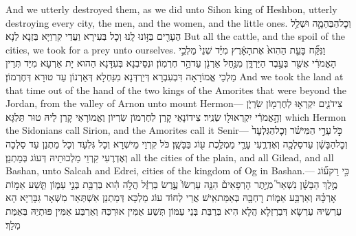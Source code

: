 {And we utterly destroyed them, as we did unto Sihon king of Heshbon, utterly destroying every city, the men, and the women, and the little ones.}{}
{וְכׇל\maqqaf הַבְּהֵמָ֛ה וּשְׁלַ֥ל הֶעָרִ֖ים בַּזּ֥וֹנוּ לָֽנוּ׃}
{וְכָל בְּעִירָא וַעֲדַי קִרְוַיָּא בַּזְנָא לַנָא׃}
{But all the cattle, and the spoil of the cities, we took for a prey unto ourselves.}{}
{וַנִּקַּ֞ח בָּעֵ֤ת הַהִוא֙ אֶת\maqqaf הָאָ֔רֶץ מִיַּ֗ד שְׁנֵי֙ מַלְכֵ֣י הָאֱמֹרִ֔י אֲשֶׁ֖ר בְּעֵ֣בֶר הַיַּרְדֵּ֑ן מִנַּ֥חַל אַרְנֹ֖ן עַד\maqqaf הַ֥ר חֶרְמֽוֹן׃}
{וּנְסֵיבְנָא בְּעִדָּנָא הַהוּא יָת אַרְעָא מִיַּד תְּרֵין מַלְכֵי אֱמוֹרָאָה דִּבְעִבְרָא דְּיַרְדְּנָא מִנַּחְלָא דְּאַרְנוֹן עַד טוּרָא דְּחֶרְמוֹן׃}
{And we took the land at that time out of the hand of the two kings of the Amorites that were beyond the Jordan, from the valley of Arnon unto mount Hermon—}{}
{צִידֹנִ֛ים יִקְרְא֥וּ לְחֶרְמ֖וֹן שִׂרְיֹ֑ן וְהָ֣אֱמֹרִ֔י יִקְרְאוּ\maqqaf ל֖וֹ שְׂנִֽיר׃}
{צִידוֹנָאֵי קָרַן לְחֶרְמוֹן שִׂרְיוֹן וֶאֱמוֹרָאֵי קָרַן לֵיהּ טוּר תַּלְגָּא׃}
{which Hermon the Sidonians call Sirion, and the Amorites call it Senir—}{}
{כֹּ֣ל \legarmeh  עָרֵ֣י הַמִּישֹׁ֗ר וְכׇל\maqqaf הַגִּלְעָד֙ וְכׇל\maqqaf הַבָּשָׁ֔ן עַד\maqqaf סַלְכָ֖ה וְאֶדְרֶ֑עִי עָרֵ֛י מַמְלֶ֥כֶת ע֖וֹג בַּבָּשָֽׁן׃}
{כֹּל קִרְוֵי מֵישְׁרָא וְכָל גִּלְעָד וְכָל מַתְנַן עַד סַלְכָה וְאֶדְרֶעִי קִרְוֵי מַלְכוּתֵיהּ דְּעוֹג בְּמַתְנַן׃}
{all the cities of the plain, and all Gilead, and all Bashan, unto Salcah and Edrei, cities of the kingdom of Og in Bashan.—}{}
{כִּ֣י רַק\maqqaf ע֞וֹג מֶ֣לֶךְ הַבָּשָׁ֗ן נִשְׁאַר֮ מִיֶּ֣תֶר הָרְפָאִים֒ הִנֵּ֤ה עַרְשׂוֹ֙ עֶ֣רֶשׂ בַּרְזֶ֔ל הֲלֹ֣ה הִ֔וא בְּרַבַּ֖ת בְּנֵ֣י עַמּ֑וֹן תֵּ֧שַׁע אַמּ֣וֹת אׇרְכָּ֗הּ וְאַרְבַּ֥ע אַמּ֛וֹת רׇחְבָּ֖הּ בְּאַמַּת\maqqaf אִֽישׁ׃}
{אֲרֵי לְחוֹד עוֹג מַלְכָּא דְּמַתְנַן אִשְׁתְּאַר מִשְּׁאָר גִּבָּרַיָּא הָא עַרְשֵׂיהּ עַרְשָׂא דְּבַרְזְלָא הֲלָא הִיא בְּרַבַּת בְּנֵי עַמּוֹן תְּשַׁע אַמִּין אוּרְכַּהּ וְאַרְבַּע אַמִּין פּוּתְיַהּ בְּאַמַּת מְלַךְ׃}
